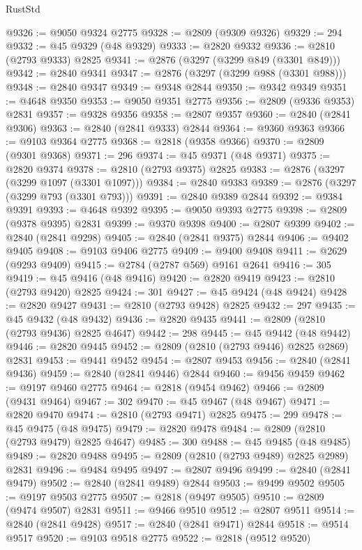 \begin{lexlean}{RustStd}
\begin{coremodule}
{\begin{coremodule}
{{{{{{{{{{{{{{{{{{{{{{{{{{{{{{{{{@9326 := @9050 @9324 @2775
@9328 := @2809 (@9309 @9326)
@9329 := 294
@9332 := @45 @9329 (@48 @9329)
@9333 := @2820 @9332
@9336 := @2810 (@2793 @9333) @2825
@9341 := @2876 (@3297 (@3299 @849 (@3301 @849)))
@9342 := @2840 @9341
@9347 := @2876 (@3297 (@3299 @988 (@3301 @988)))
@9348 := @2840 @9347
@9349 := @9348 @2844
@9350 := @9342 @9349
@9351 := @4648 @9350
@9353 := @9050 @9351 @2775
@9356 := @2809 (@9336 @9353) @2831
@9357 := @9328 @9356
@9358 := @2807 @9357
@9360 := @2840 (@2841 @9306)
@9363 := @2840 (@2841 @9333) @2844
@9364 := @9360 @9363
@9366 := @9103 @9364 @2775
@9368 := @2818 (@9358 @9366)
@9370 := @2809 (@9301 @9368)
@9371 := 296
@9374 := @45 @9371 (@48 @9371)
@9375 := @2820 @9374
@9378 := @2810 (@2793 @9375) @2825
@9383 := @2876 (@3297 (@3299 @1097 (@3301 @1097)))
@9384 := @2840 @9383
@9389 := @2876 (@3297 (@3299 @793 (@3301 @793)))
@9391 := @2840 @9389 @2844
@9392 := @9384 @9391
@9393 := @4648 @9392
@9395 := @9050 @9393 @2775
@9398 := @2809 (@9378 @9395) @2831
@9399 := @9370 @9398
@9400 := @2807 @9399
@9402 := @2840 (@2841 @9298)
@9405 := @2840 (@2841 @9375) @2844
@9406 := @9402 @9405
@9408 := @9103 @9406 @2775
@9409 := @9400 @9408
@9411 := @2629 (@9293 @9409)
@9415 := @2784 (@2787 @569) @9161 @2641
@9416 := 305
@9419 := @45 @9416 (@48 @9416)
@9420 := @2820 @9419
@9423 := @2810 (@2793 @9420) @2825
@9424 := 301
@9427 := @45 @9424 (@48 @9424)
@9428 := @2820 @9427
@9431 := @2810 (@2793 @9428) @2825
@9432 := 297
@9435 := @45 @9432 (@48 @9432)
@9436 := @2820 @9435
@9441 := @2809 (@2810 (@2793 @9436) @2825 @4647)
@9442 := 298
@9445 := @45 @9442 (@48 @9442)
@9446 := @2820 @9445
@9452 := @2809 (@2810 (@2793 @9446) @2825 @2869) @2831
@9453 := @9441 @9452
@9454 := @2807 @9453
@9456 := @2840 (@2841 @9436)
@9459 := @2840 (@2841 @9446) @2844
@9460 := @9456 @9459
@9462 := @9197 @9460 @2775
@9464 := @2818 (@9454 @9462)
@9466 := @2809 (@9431 @9464)
@9467 := 302
@9470 := @45 @9467 (@48 @9467)
@9471 := @2820 @9470
@9474 := @2810 (@2793 @9471) @2825
@9475 := 299
@9478 := @45 @9475 (@48 @9475)
@9479 := @2820 @9478
@9484 := @2809 (@2810 (@2793 @9479) @2825 @4647)
@9485 := 300
@9488 := @45 @9485 (@48 @9485)
@9489 := @2820 @9488
@9495 := @2809 (@2810 (@2793 @9489) @2825 @2989) @2831
@9496 := @9484 @9495
@9497 := @2807 @9496
@9499 := @2840 (@2841 @9479)
@9502 := @2840 (@2841 @9489) @2844
@9503 := @9499 @9502
@9505 := @9197 @9503 @2775
@9507 := @2818 (@9497 @9505)
@9510 := @2809 (@9474 @9507) @2831
@9511 := @9466 @9510
@9512 := @2807 @9511
@9514 := @2840 (@2841 @9428)
@9517 := @2840 (@2841 @9471) @2844
@9518 := @9514 @9517
@9520 := @9103 @9518 @2775
@9522 := @2818 (@9512 @9520)
}}}}}}}}}}}}}}}}}}}}}}}}}}}}}}}}}
\end{coremodule}}
\end{coremodule}
\end{lexlean}
